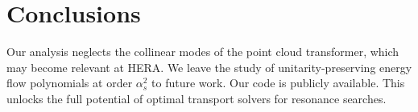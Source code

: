\section{Conclusions}\label{sec:conclusions}

Our analysis neglects the collinear modes of the point cloud
transformer, which may become relevant at HERA. We leave the study of
unitarity-preserving energy flow polynomials at order $\alpha_s^2$ to
future work. Our code is publicly available. This unlocks the full
potential of optimal transport solvers for resonance searches.


